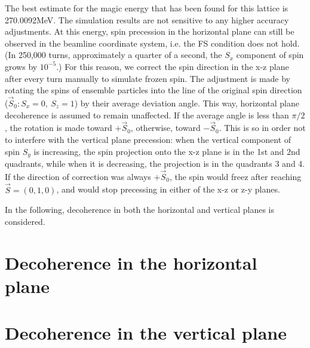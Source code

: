 \documentclass{article}
\newcommand{\Kmagic}{270.0092} %
\begin{document}
The best estimate for the magic energy that has been found for this lattice is \Kmagic MeV. The simulation results are not sensitive to any higher accuracy adjustments. At this energy, spin precession in the horizontal plane can still be observed in the beamline coordinate system, i.e. the FS condition does not hold. (In 250,000 turns, approximately a quarter of a second, the $S_x$ component of spin grows by $10^{-5}$.) For this reason, we correct the spin direction in the x-z plane after every turn manually to simulate frozen spin. The adjustment is made by rotating the spins of ensemble particles into the line of the original spin direction ($\vec S_0: S_x = 0,~ S_z = 1$) by their average deviation angle. This way, horizontal plane decoherence is assumed to remain unaffected. If the average angle is less than $\pi/2$, the rotation is made toward $+\vec S_0$, otherwise, toward $-\vec S_0$. This is so in order not to interfere with the vertical plane precession: when the vertical component of spin $S_y$ is increasing, the spin projection onto the x-z plane is in the 1st and 2nd quadrants, while when it is decreasing, the projection is in the quadrants 3 and 4. If the direction of correction was always $+\vec S_0$, the spin would freez after reaching $\vec S = (0, 1, 0)$, and would stop precessing in either of the x-z or z-y planes.

In the following, decoherence in both the horizontal and vertical planes is considered.

\section{Decoherence in the horizontal plane}

\section{Decoherence in the vertical plane}
\end{document}
